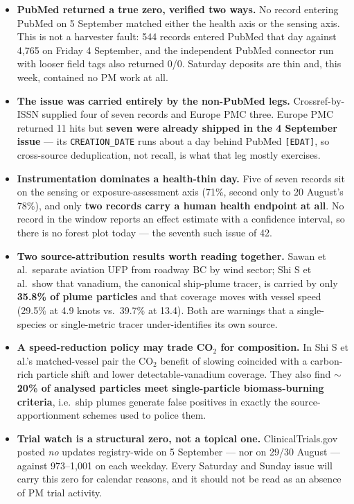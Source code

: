 \documentclass[10pt]{article}
\begin{document}
\footnotesize
\begin{itemize}
\item \textbf{PubMed returned a true zero, verified two ways.} No record entering PubMed on
5 September matched either the health axis or the sensing axis. This is not a harvester
fault: 544 records entered PubMed that day against 4{,}765 on Friday 4 September, and the
independent PubMed connector run with looser field tags also returned 0/0. Saturday
deposits are thin and, this week, contained no PM work at all.

\item \textbf{The issue was carried entirely by the non-PubMed legs.} Crossref-by-ISSN
supplied four of seven records and Europe PMC three. Europe PMC returned 11 hits but
\textbf{seven were already shipped in the 4 September issue} --- its
\texttt{CREATION\_DATE} runs about a day behind PubMed \texttt{[EDAT]}, so cross-source
deduplication, not recall, is what that leg mostly exercises.

\item \textbf{Instrumentation dominates a health-thin day.} Five of seven records sit on
the sensing or exposure-assessment axis (71\%, second only to 20 August's 78\%), and only
\textbf{two records carry a human health endpoint at all}. No record in the window reports
an effect estimate with a confidence interval, so there is no forest plot today --- the
seventh such issue of 42.

\item \textbf{Two source-attribution results worth reading together.} Sawan et al.\ separate
aviation UFP from roadway BC by wind sector; Shi S et al.\ show that vanadium, the
canonical ship-plume tracer, is carried by only \textbf{35.8\% of plume particles} and that
coverage moves with vessel speed (29.5\% at 4.9 knots vs.\ 39.7\% at 13.4). Both are
warnings that a single-species or single-metric tracer under-identifies its own source.

\item \textbf{A speed-reduction policy may trade CO$_2$ for composition.} In Shi S et al.'s
matched-vessel pair the CO$_2$ benefit of slowing coincided with a carbon-rich particle
shift and lower detectable-vanadium coverage. They also find \textbf{$\sim$20\% of analysed
particles meet single-particle biomass-burning criteria}, i.e.\ ship plumes generate false
positives in exactly the source-apportionment schemes used to police them.

\item \textbf{Trial watch is a structural zero, not a topical one.} ClinicalTrials.gov
posted \emph{no} updates registry-wide on 5 September --- nor on 29/30 August --- against
973--1{,}001 on each weekday. Every Saturday and Sunday issue will carry this zero for
calendar reasons, and it should not be read as an absence of PM trial activity.


\end{itemize}
\end{document}
